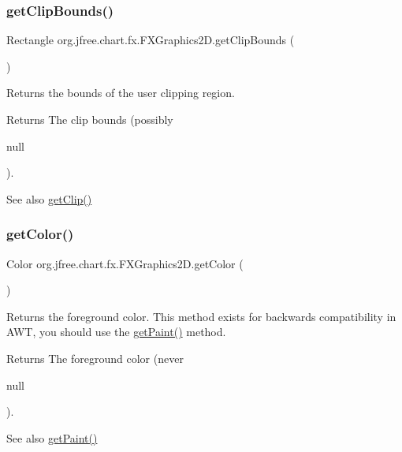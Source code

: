 \subsubsection{\texorpdfstring{get\+Clip\+Bounds()}{getClipBounds()}}
{\footnotesize\ttfamily Rectangle org.\+jfree.\+chart.\+fx.\+F\+X\+Graphics2\+D.\+get\+Clip\+Bounds (\begin{DoxyParamCaption}{ }\end{DoxyParamCaption})}

Returns the bounds of the user clipping region.

\begin{DoxyReturn}{Returns}
The clip bounds (possibly
\begin{DoxyCode}
null 
\end{DoxyCode}
 ).
\end{DoxyReturn}
\begin{DoxySeeAlso}{See also}
\mbox{\hyperlink{classorg_1_1jfree_1_1chart_1_1fx_1_1_f_x_graphics2_d_adab65fa84e10b25840c2d8af0f2e3356}{get\+Clip()}} 
\end{DoxySeeAlso}
\mbox{\label{classorg_1_1jfree_1_1chart_1_1fx_1_1_f_x_graphics2_d_a5c607df80f641c535f4967ab2bb58d8f}} 
\subsubsection{\texorpdfstring{get\+Color()}{getColor()}}
{\footnotesize\ttfamily Color org.\+jfree.\+chart.\+fx.\+F\+X\+Graphics2\+D.\+get\+Color (\begin{DoxyParamCaption}{ }\end{DoxyParamCaption})}

Returns the foreground color. This method exists for backwards compatibility in A\+WT, you should use the \mbox{\hyperlink{classorg_1_1jfree_1_1chart_1_1fx_1_1_f_x_graphics2_d_a67325fdaf847a6daf0d98da1771f5638}{get\+Paint()}} method.

\begin{DoxyReturn}{Returns}
The foreground color (never
\begin{DoxyCode}
null 
\end{DoxyCode}
 ).
\end{DoxyReturn}
\begin{DoxySeeAlso}{See also}
\mbox{\hyperlink{classorg_1_1jfree_1_1chart_1_1fx_1_1_f_x_graphics2_d_a67325fdaf847a6daf0d98da1771f5638}{get\+Paint()}} 
\end{DoxySeeAlso}
\mbox{\label{classorg_1_1jfree_1_1chart_1_1fx_1_1_f_x_graphics2_d_ad464b911fede89539635352d2f89e4d7}} 

